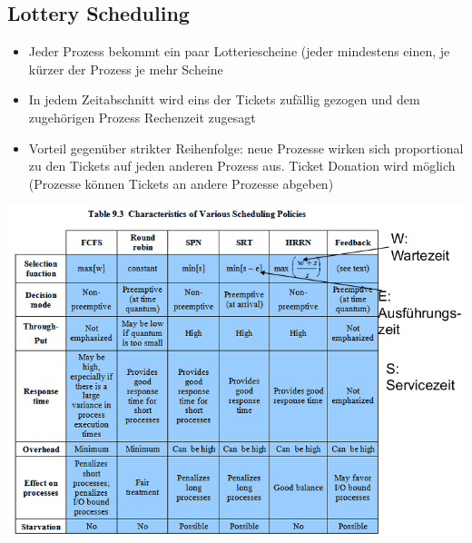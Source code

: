 \documentclass[a4paper]{scrreprt}
\begin{document}
\subsection{Lottery Scheduling}
\begin{itemize}
\item Jeder Prozess bekommt ein paar Lotteriescheine (jeder mindestens einen, je kürzer der Prozess je mehr Scheine
\item In jedem Zeitabschnitt wird eins der Tickets zufällig gezogen und dem zugehörigen Prozess Rechenzeit zugesagt
\item Vorteil gegenüber strikter Reihenfolge: neue Prozesse wirken sich proportional zu den Tickets auf jeden anderen Prozess aus. Ticket Donation wird möglich (Prozesse können Tickets an andere Prozesse abgeben)
\end{itemize}
\includegraphics[width = 1.0\linewidth]{graphics/scheduling_policies.png}
\end{document}
